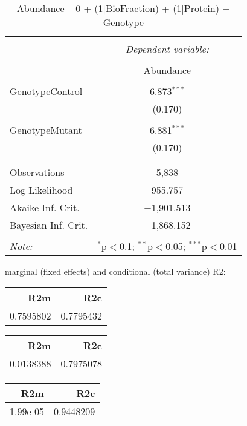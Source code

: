\documentclass[11pt]{report}
\begin{document}
\begin{table}[!htbp] \centering 
  \caption{Abundance ~ 0 + (1|BioFraction) + (1|Protein) + Genotype} 
  \label{} 
\begin{tabular}{@{\extracolsep{5pt}}lc} 
\\[-1.8ex]\hline 
\hline \\[-1.8ex] 
 & \multicolumn{1}{c}{\textit{Dependent variable:}} \\ 
\cline{2-2} 
\\[-1.8ex] & Abundance \\ 
\hline \\[-1.8ex] 
 GenotypeControl & 6.873$^{***}$ \\ 
  & (0.170) \\ 
  & \\ 
 GenotypeMutant & 6.881$^{***}$ \\ 
  & (0.170) \\ 
  & \\ 
\hline \\[-1.8ex] 
Observations & 5,838 \\ 
Log Likelihood & 955.757 \\ 
Akaike Inf. Crit. & $-$1,901.513 \\ 
Bayesian Inf. Crit. & $-$1,868.152 \\ 
\hline 
\hline \\[-1.8ex] 
\textit{Note:}  & \multicolumn{1}{r}{$^{*}$p$<$0.1; $^{**}$p$<$0.05; $^{***}$p$<$0.01} \\ 
\end{tabular} 
\end{table} 
marginal (fixed effects) and conditional (total variance) R2:

\begin{tabular}{r|r}
\hline
R2m & R2c\\
\hline
0.7595802 & 0.7795432\\
\hline
\end{tabular}

\begin{tabular}{r|r}
\hline
R2m & R2c\\
\hline
0.0138388 & 0.7975078\\
\hline
\end{tabular}

\begin{tabular}{r|r}
\hline
R2m & R2c\\
\hline
1.99e-05 & 0.9448209\\
\hline
\end{tabular}
\end{document}
